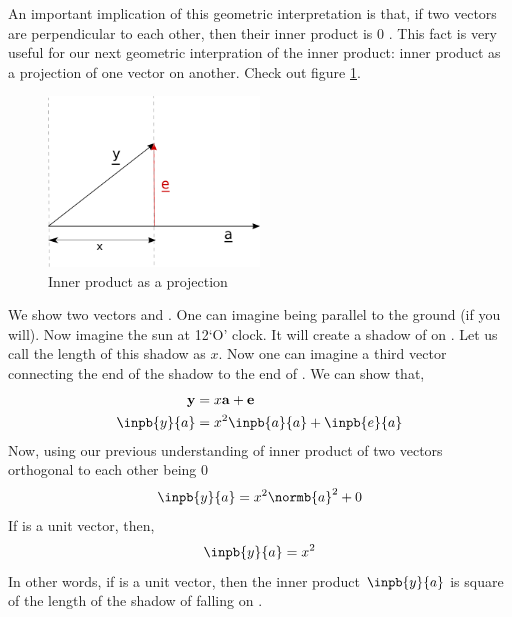 An important implication of this geometric interpretation is that, if two vectors are perpendicular to each other, then their inner product is \(0\) . This fact is very useful for our next geometric interpration of the inner product: inner product as a projection of one vector on another. Check out figure \ref{fig:inner_product_projection}. 
	\begin{figure}[h!]
	\centering
	\includegraphics[width=0.5\textwidth]{Linear_Algebra/inner_product_projection}
	\caption{Inner product as a projection}
	\label{fig:inner_product_projection}
	\end{figure}
We show two vectors  and . One can imagine  being parallel to the ground (if you will). Now imagine the sun at 12`O' clock. It will create a shadow of  on . Let us call the length of this shadow as \(x\). Now one can imagine a third vector  connecting the end of the shadow to the end of . We can show that,
	\begin{align*}
	\mathbf{y} &= x\mathbf{a} + \mathbf{e} \\
	\inpb{y}{a} &= x^2\inpb{a}{a} + \inpb{e}{a}
	\end{align*}
	Now, using our previous understanding of inner product of two vectors orthogonal to each other being \(0\)
	\[ \inpb{y}{a} = x^2\normb{a}^2 + 0 \]
	If  is a unit vector, then,
	\[ \inpb{y}{a} = x^2 \] 
In other words, if  is a unit vector, then the inner product \( \inpb{y}{a} \) is square of the length of the shadow of  falling on .
	
